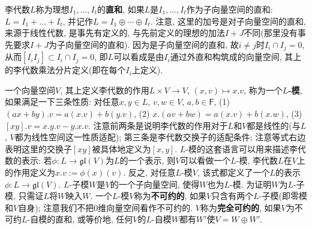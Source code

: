 \documentclass{ctexart}%
\theoremstyle{definition}
\theoremstyle{remark}
\begin{document}
李代数$L$称为理想$I_1,...,I_t$的\textbf{直和}, 如果$L$是$I_1,...,I_t$作为子向量空间的直和: $L=I_1+...+I_t$, 并记作$L=I_1\oplus \cdots \oplus I_t$. 注意, 这里的加号是对子向量空间的直和, 来源于线性代数, 是事先有定义的, 与先前定义的理想的加法$I+J$不同(那里没有事先要求$I+J$为子向量空间的直和). 因为是子向量空间的直和, 故$i\neq j$时$I_i\cap I_j=0$, 从而$[I_iI_j]\subset I_i\cap I_j =0$, 即$L$可以看成是由$I_i$通过外直和构筑成的向量空间, 其上的李代数乘法分片定义(即在每个$I_i$上定义). 

一个向量空间$V$, 其上定义李代数的作用$L\times V\rightarrow V$, $(x,v)\mapsto x.v$, 称为一个\textbf{$L$-模}, 如果满足一下三条性质: 对任意$x,y\in L$, $v,w\in V$, $a,b\in \mathsf{F}$, (1)$(ax+by).v=a(x.v)+b(y.v)$, (2) $x.(av+bw)=a(x.v)+b(x.w)$, (3) $[xy].v=x.y.v-y.x.v$. 注意前两条是说明李代数的作用对于$L$和$V$都是线性的(与$L$, $V$都为线性空间这一性质适配); 第三条是李代数交换子的适配条件; 注意等式右边表明这里的交换子$[xy]$被具体地定义为$[x,y]$. $L$-模的这套语言可以用来描述李代数的表示: 若$\phi\colon L\rightarrow \mathfrak{gl}(V)$为$L$的一个表示, 则$V$可以看做一个$L$-模, 李代数$L$在$V$上的作用定义为$x.v:= \phi(x)(v)$. 反之, 对任意$L$-模$V$, 该式都定义了一个$L$的表示$\phi\colon L\rightarrow \mathfrak{gl}(V)$. $L$-子模$W$是$V$的一个子向量空间, 使得$W$也为$L$-模. 为证明$W$为$L$-子模, 只需证$L$将$W$映入$W$. 一个$L$-模$V$称为\textbf{不可约的}, 如果$V$只含有两个$L$-子模(即零模和$V$自身); 注意我们不把0维向量空间看作不可约的. $V$称为\textbf{完全可约的}, 如果$V$为不可约$L$-自模的直和, 或等价地, 任何$V$的$L$-自模$W$都有$W'$使$V=W\oplus W'$. 
\end{document}
